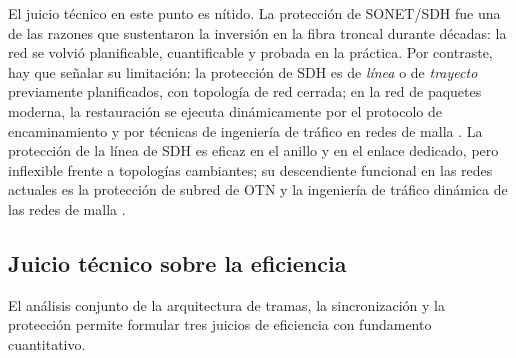 \documentclass[12pt,a4paper]{article}
\begin{document}
El juicio técnico en este punto es nítido. La protección de SONET/SDH fue una de las razones que sustentaron la inversión en la fibra troncal durante décadas: la red se volvió planificable, cuantificable y probada en la práctica. Por contraste, hay que señalar su limitación: la protección de SDH es de \emph{línea} o de \emph{trayecto} previamente planificados, con topología de red cerrada; en la red de paquetes moderna, la restauración se ejecuta dinámicamente por el protocolo de encaminamiento y por técnicas de ingeniería de tráfico en redes de malla \cite{kurose2017}. La protección de la línea de SDH es eficaz en el anillo y en el enlace dedicado, pero inflexible frente a topologías cambiantes; su descendiente funcional en las redes actuales es la protección de subred de OTN y la ingeniería de tráfico dinámica de las redes de malla \cite{ituG803}.

\subsection{Juicio técnico sobre la eficiencia}

El análisis conjunto de la arquitectura de tramas, la sincronización y la protección permite formular tres juicios de eficiencia con fundamento cuantitativo.
\end{document}
